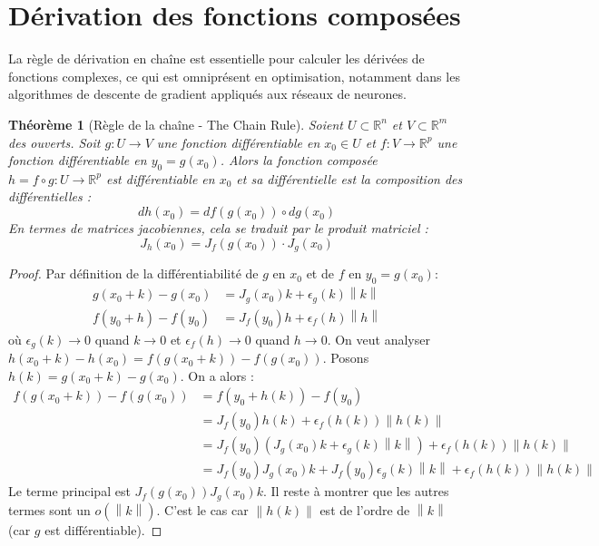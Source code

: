\documentclass[a4paper,12pt,openany]{book}
\theoremstyle{plain}
\newtheorem{theorem}{Théorème}[section]
\theoremstyle{definition}
\theoremstyle{remark}
\theoremstyle{nbstyle}
\newcommand{\R}{\mathbb{R}}
\newcommand{\norm}[1]{\left\lVert#1\right\rVert}
\begin{document}
	
	\section{Dérivation des fonctions composées}
	
	La règle de dérivation en chaîne est essentielle pour calculer les dérivées de fonctions complexes, ce qui est omniprésent en optimisation, notamment dans les algorithmes de descente de gradient appliqués aux réseaux de neurones.
	
	\begin{theorem}[Règle de la chaîne - The Chain Rule]
		Soient $U \subset \R^n$ et $V \subset \R^m$ des ouverts. Soit $g: U \to V$ une fonction différentiable en $x_0 \in U$ et $f: V \to \R^p$ une fonction différentiable en $y_0 = g(x_0)$.
		Alors la fonction composée $h = f \circ g : U \to \R^p$ est différentiable en $x_0$ et sa différentielle est la composition des différentielles :
		$$ dh(x_0) = df(g(x_0)) \circ dg(x_0) $$
		En termes de matrices jacobiennes, cela se traduit par le produit matriciel :
		$$ J_h(x_0) = J_f(g(x_0)) \cdot J_g(x_0) $$
	\end{theorem}
	
	\begin{proof}
		Par définition de la différentiabilité de $g$ en $x_0$ et de $f$ en $y_0 = g(x_0)$:
		\begin{align*}
		g(x_0+k) - g(x_0) &= J_g(x_0)k + \epsilon_g(k) \norm{k} \\
		f(y_0+h) - f(y_0) &= J_f(y_0)h + \epsilon_f(h) \norm{h}
		\end{align*}
		où $\epsilon_g(k) \to 0$ quand $k \to 0$ et $\epsilon_f(h) \to 0$ quand $h \to 0$.
		On veut analyser $h(x_0+k) - h(x_0) = f(g(x_0+k)) - f(g(x_0))$.
		Posons $h(k) = g(x_0+k) - g(x_0)$. On a alors :
		\begin{align*}
		f(g(x_0+k)) - f(g(x_0)) &= f(y_0 + h(k)) - f(y_0) \\
		&= J_f(y_0)h(k) + \epsilon_f(h(k)) \norm{h(k)} \\
		&= J_f(y_0)(J_g(x_0)k + \epsilon_g(k)\norm{k}) + \epsilon_f(h(k))\norm{h(k)} \\
		&= J_f(y_0)J_g(x_0)k + J_f(y_0)\epsilon_g(k)\norm{k} + \epsilon_f(h(k))\norm{h(k)}
		\end{align*}
		Le terme principal est $J_f(g(x_0))J_g(x_0)k$. Il reste à montrer que les autres termes sont un $o(\norm{k})$. C'est le cas car $\norm{h(k)}$ est de l'ordre de $\norm{k}$ (car $g$ est différentiable).
	\end{proof}
	
\end{document}
